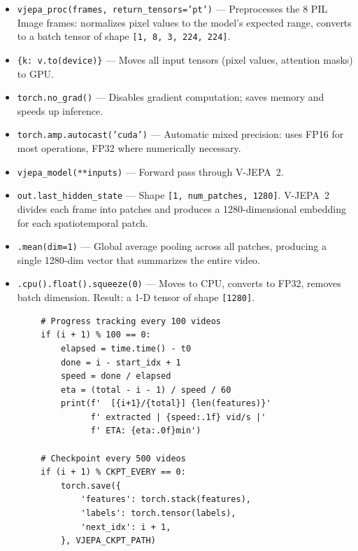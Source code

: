 \begin{explanation}
\begin{itemize}[nosep]
  \item \texttt{vjepa\_proc(frames, return\_tensors='pt')} --- Preprocesses the 8 PIL Image frames: normalizes pixel values to the model's expected range, converts to a batch tensor of shape \texttt{[1, 8, 3, 224, 224]}.
  \item \texttt{\{k: v.to(device)\}} --- Moves all input tensors (pixel values, attention masks) to GPU.
  \item \texttt{torch.no\_grad()} --- Disables gradient computation; saves memory and speeds up inference.
  \item \texttt{torch.amp.autocast('cuda')} --- Automatic mixed precision: uses FP16 for most operations, FP32 where numerically necessary.
  \item \texttt{vjepa\_model(**inputs)} --- Forward pass through V-JEPA~2.
  \item \texttt{out.last\_hidden\_state} --- Shape \texttt{[1, num\_patches, 1280]}. V-JEPA~2 divides each frame into patches and produces a 1280-dimensional embedding for each spatiotemporal patch.
  \item \texttt{.mean(dim=1)} --- Global average pooling across all patches, producing a single 1280-dim vector that summarizes the entire video.
  \item \texttt{.cpu().float().squeeze(0)} --- Moves to CPU, converts to FP32, removes batch dimension. Result: a 1-D tensor of shape \texttt{[1280]}.
\end{itemize}
\end{explanation}

\begin{lstlisting}
        # Progress tracking every 100 videos
        if (i + 1) % 100 == 0:
            elapsed = time.time() - t0
            done = i - start_idx + 1
            speed = done / elapsed
            eta = (total - i - 1) / speed / 60
            print(f'  [{i+1}/{total}] {len(features)}'
                  f' extracted | {speed:.1f} vid/s |'
                  f' ETA: {eta:.0f}min')

        # Checkpoint every 500 videos
        if (i + 1) % CKPT_EVERY == 0:
            torch.save({
                'features': torch.stack(features),
                'labels': torch.tensor(labels),
                'next_idx': i + 1,
            }, VJEPA_CKPT_PATH)
\end{lstlisting}

